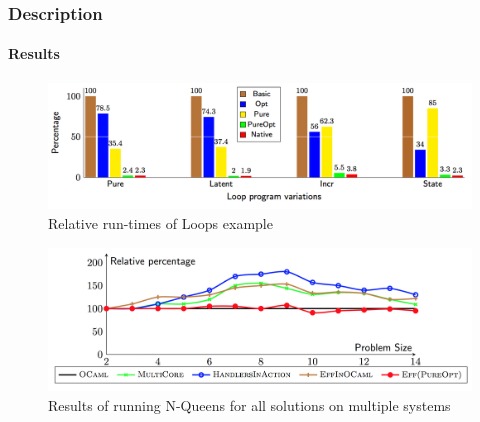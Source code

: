 \documentclass{beamer}
\begin{document}

\begin{frame}
\frametitle{Description}
\framesubtitle{Results}

\begin{figure}[h!]
\centering
\includegraphics[width=\textwidth]{loop}
\caption{Relative run-times of Loops example  \cite{own}}
\label{fig:loops}
\end{figure}

\begin{figure}[h!]
\includegraphics[width=\textwidth]{allqueens}
\caption{Results of running N-Queens for all solutions on multiple systems  \cite{own}}
\label{fig:systemsall}
\end{figure}


\end{frame}

\end{document}
